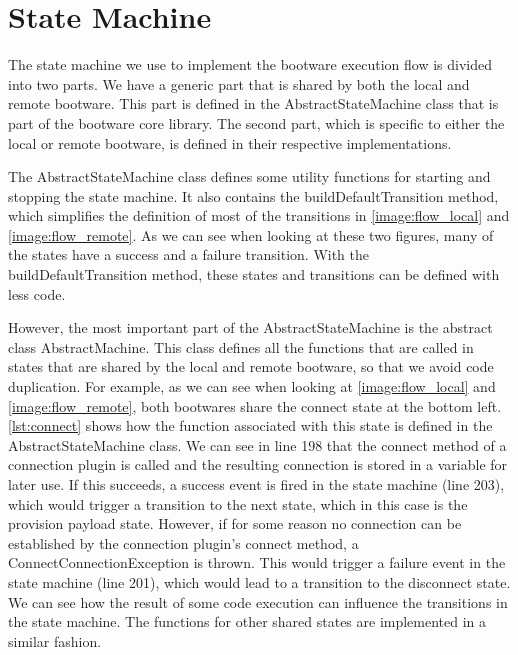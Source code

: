 \section{State Machine}
\label{implementation:statemachine}

The state machine we use to implement the bootware execution flow is divided into two parts.
We have a generic part that is shared by both the local and remote bootware.
This part is defined in the AbstractStateMachine class that is part of the bootware core library.
The second part, which is specific to either the local or remote bootware, is defined in their respective implementations.

The AbstractStateMachine class defines some utility functions for starting and stopping the state machine.
It also contains the buildDefaultTransition method, which simplifies the definition of most of the transitions in \autoref{image:flow_local} and \autoref{image:flow_remote}.
As we can see when looking at these two figures, many of the states have a success and a failure transition.
With the buildDefaultTransition method, these states and transitions can be defined with less code.

However, the most important part of the AbstractStateMachine is the abstract class AbstractMachine.
This class defines all the functions that are called in states that are shared by the local and remote bootware, so that we avoid code duplication.
For example, as we can see when looking at \autoref{image:flow_local} and \autoref{image:flow_remote}, both bootwares share the connect state at the bottom left.
\autoref{lst:connect} shows how the function associated with this state is defined in the AbstractStateMachine class.
We can see in line 198 that the connect method of a connection plugin is called and the resulting connection is stored in a variable for later use.
If this succeeds, a success event is fired in the state machine (line 203), which would trigger a transition to the next state, which in this case is the provision payload state.
However, if for some reason no connection can be established by the connection plugin's connect method, a ConnectConnectionException is thrown.
This would trigger a failure event in the state machine (line 201), which would lead to a transition to the disconnect state.
We can see how the result of some code execution can influence the transitions in the state machine.
The functions for other shared states are implemented in a similar fashion.

\vspace*{\baselineskip}

